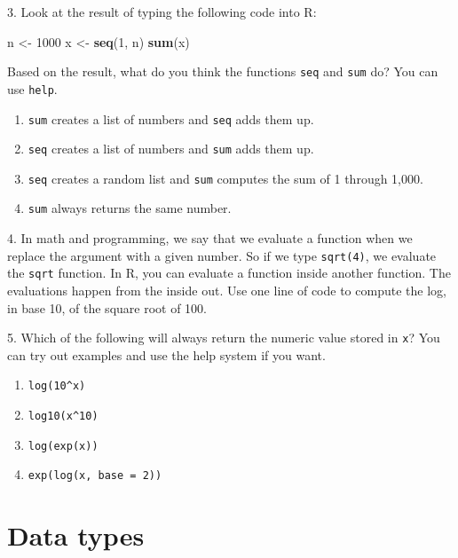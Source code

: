 \documentclass[
]{krantz}
\newenvironment{Shaded}{\begin{snugshade}}{\end{snugshade}}
\newcommand{\DecValTok}[1]{\textcolor[rgb]{0.06,0.06,0.06}{#1}}
\newcommand{\KeywordTok}[1]{\textcolor[rgb]{0.27,0.27,0.27}{\textbf{#1}}}
\newcommand{\NormalTok}[1]{#1}
\newcommand{\StringTok}[1]{\textcolor[rgb]{0.5,0.5,0.5}{#1}}
\providecommand{\tightlist}{%
  \setlength{\itemsep}{0pt}\setlength{\parskip}{0pt}}
\begin{document}
3. Look at the result of typing the following code into R:

\begin{Shaded}
\begin{Highlighting}[]
\NormalTok{n <-}\StringTok{ }\DecValTok{1000}
\NormalTok{x <-}\StringTok{ }\KeywordTok{seq}\NormalTok{(}\DecValTok{1}\NormalTok{, n)}
\KeywordTok{sum}\NormalTok{(x)}
\end{Highlighting}
\end{Shaded}

Based on the result, what do you think the functions \texttt{seq} and \texttt{sum} do? You can use \texttt{help}.

\begin{enumerate}
\def\labelenumi{\alph{enumi}.}
\tightlist
\item
  \texttt{sum} creates a list of numbers and \texttt{seq} adds them up.
\item
  \texttt{seq} creates a list of numbers and \texttt{sum} adds them up.
\item
  \texttt{seq} creates a random list and \texttt{sum} computes the sum of 1 through 1,000.
\item
  \texttt{sum} always returns the same number.
\end{enumerate}

4. In math and programming, we say that we evaluate a function when we replace the argument with a given number. So if we type \texttt{sqrt(4)}, we evaluate the \texttt{sqrt} function. In R, you can evaluate a function inside another function. The evaluations happen from the inside out. Use one line of code to compute the log, in base 10, of the square root of 100.

5. Which of the following will always return the numeric value stored in \texttt{x}? You can try out examples and use the help system if you want.

\begin{enumerate}
\def\labelenumi{\alph{enumi}.}
\tightlist
\item
  \texttt{log(10\^{}x)}
\item
  \texttt{log10(x\^{}10)}
\item
  \texttt{log(exp(x))}
\item
  \texttt{exp(log(x,\ base\ =\ 2))}
\end{enumerate}

\hypertarget{data-types}{%
\section{Data types}\label{data-types}}
\end{document}

